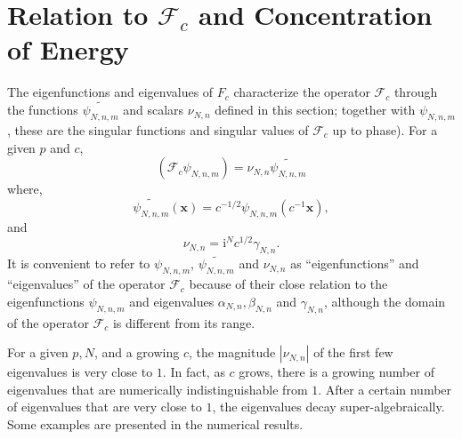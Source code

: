 \documentclass[12pt]{article}
\begin{document}
%
%
%
\section{Relation to $\mathcal{F}_c$ and Concentration of Energy}\label{sec:native_unscaled}

The eigenfunctions and eigenvalues of ${F}_c$ characterize the operator $\mathcal{F}_c$ through the functions 
$\widetilde{\psi_{N,n,m}}$ and scalars $\nu_{N,n}$ defined in this section; 
together with $\psi_{N,n,m}$, these are the singular functions and singular values of $\mathcal{F}_c$ up to phase).
For a given $p$ and $c$, 
\begin{equation}
 \left( \mathcal{F}_c \psi_{N,n,m}\right) = \nu_{N,n} \widetilde{\psi_{N,n,m}}
\end{equation}
where,
\begin{equation}\label{eq:def:tilde_psi}
  \widetilde{\psi_{N,n,m}}({\bm x}) = c^{-1/2} {\psi_{N,n,m}}({c^{-1}\bm x}),
\end{equation}
and
\begin{equation}\label{eq:nu}
  \nu_{N,n} = \mathrm{i}^N c^{1/2} \gamma_{N,n}  .
\end{equation}
It is convenient to refer to $\psi_{N,n,m}$, $\widetilde{\psi_{N,n,m}}$ and $\nu_{N,n}$ as ``eigenfunctions'' and ``eigenvalues'' of the operator $\mathcal{F}_c$ because of their close relation to the eigenfunctions $\psi_{N,n,m}$ and eigenvalues $\alpha_{N,n},\beta_{N,n}$ and $\gamma_{N,n}$, although the domain of the operator  $\mathcal{F}_c$ is different from its range.



For a given $p,N$, and a growing $c$, the magnitude $|\nu_{N,n}|$ of the first few eigenvalues is very close to $1$. 
In fact, as $c$ grows, there is a growing number of eigenvalues that are numerically indistinguishable from $1$. 
After a certain number of eigenvalues that are very close to $1$, the eigenvalues decay super-algebraically. 
Some examples are presented in the numerical results. 
\end{document}
